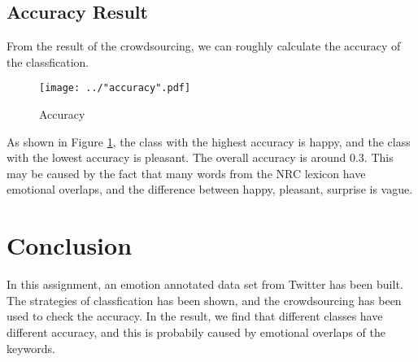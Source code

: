 \subsection{Accuracy Result}

From the result of the crowdsourcing, we can roughly calculate the accuracy of the classfication.

\begin{figure}[ht]
    \centering
    \texttt{[image: ../"accuracy".pdf]}
    \caption{Accuracy}
    \label{accuracy}
\end{figure}

As shown in Figure \ref{accuracy}, the class with the highest accuracy is happy, and the class with the lowest accuracy is pleasant. The overall accuracy is around 0.3. This may be caused by the fact that many words from the NRC lexicon have emotional overlaps, and the difference between happy, pleasant, surprise is vague.

\section{Conclusion}

In this assignment, an emotion annotated data set from Twitter has been built. The strategies of classfication has been shown, and the crowdsourcing has been used to check the accuracy. In the result, we find that different classes have different accuracy, and this is probabily caused by emotional overlaps of the keywords.
